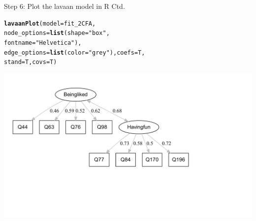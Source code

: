 \documentclass[10pt]{beamer}\usepackage[]{graphicx}\usepackage[]{xcolor}
\makeatletter
\def\maxwidth{ %
  \ifdim\Gin@nat@width>\linewidth
    \linewidth
  \else
    \Gin@nat@width
  \fi
}
\newcommand{\hlstr}[1]{\textcolor[rgb]{0.192,0.494,0.8}{#1}}%
\newcommand{\hlstd}[1]{\textcolor[rgb]{0.345,0.345,0.345}{#1}}%
\newcommand{\hlkwc}[1]{\textcolor[rgb]{0.333,0.667,0.333}{#1}}%
\newcommand{\hlkwd}[1]{\textcolor[rgb]{0.737,0.353,0.396}{\textbf{#1}}}%
\newenvironment{kframe}{%
 \def\at@end@of@kframe{}%
 \ifinner\ifhmode%
  \def\at@end@of@kframe{\end{minipage}}%
  \begin{minipage}{\columnwidth}%
 \fi\fi%
 \def\FrameCommand##1{\hskip\@totalleftmargin \hskip-\fboxsep
 \colorbox{shadecolor}{##1}\hskip-\fboxsep
     \hskip-\linewidth \hskip-\@totalleftmargin \hskip\columnwidth}%
 \MakeFramed {\advance\hsize-\width
   \@totalleftmargin\z@ \linewidth\hsize
   \@setminipage}}%
 {\par\unskip\endMakeFramed%
 \at@end@of@kframe}
\newenvironment{knitrout}{}{} %
\makeatother
\begin{document}
\begin{frame}[fragile]{Step 6: Plot the lavaan model in R Ctd.}

\begin{knitrout}
\color{fgcolor}\begin{kframe}
\begin{alltt}
\hlkwd{lavaanPlot}\hlstd{(}\hlkwc{model} \hlstd{= fit_2CFA,}
           \hlkwc{node_options} \hlstd{=} \hlkwd{list}\hlstd{(}\hlkwc{shape} \hlstd{=} \hlstr{"box"}\hlstd{,}
                               \hlkwc{fontname} \hlstd{=} \hlstr{"Helvetica"}\hlstd{),}
           \hlkwc{edge_options} \hlstd{=} \hlkwd{list}\hlstd{(}\hlkwc{color} \hlstd{=} \hlstr{"grey"}\hlstd{),} \hlkwc{coefs} \hlstd{= T,}
           \hlkwc{stand} \hlstd{= T,} \hlkwc{covs} \hlstd{= T)}
\end{alltt}
\end{kframe}
\includegraphics[width=\maxwidth]{figure/unnamed-chunk-18-1} 
\end{knitrout}
\end{frame}
%
% 
%
\end{document}
